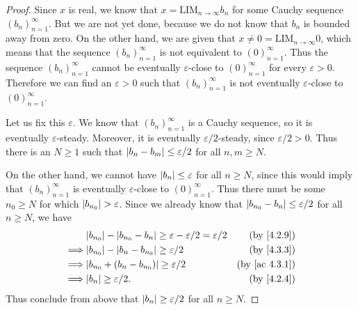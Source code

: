 \begin{proof}
  Since \(x\) is real, we know that \(x = \text{LIM}_{n \to \infty} b_n\) for some Cauchy sequence \((b_n)_{n = 1}^{\infty}\).
  But we are not yet done, because we do not know that \(b_n\) is bounded away from zero.
  On the other hand, we are given that \(x \neq 0 = \text{LIM}_{n \to \infty} 0\), which means that the sequence \((b_n)_{n = 1}^{\infty}\) is not equivalent to \((0)_{n = 1}^{\infty}\).
  Thus the sequence \((b_n)_{n = 1}^{\infty}\) cannot be eventually \(\varepsilon\)-close to \((0)_{n = 1}^{\infty}\) for every \(\varepsilon > 0\).
  Therefore we can find an \(\varepsilon > 0\) such that \((b_n)_{n = 1}^{\infty}\) is not eventually \(\varepsilon\)-close to \((0)_{n = 1}^{\infty}\).

  Let us fix this \(\varepsilon\).
  We know that \((b_n)_{n = 1}^{\infty}\) is a Cauchy sequence, so it is eventually \(\varepsilon\)-steady.
  Moreover, it is eventually \(\varepsilon / 2\)-steady, since \(\varepsilon / 2 > 0\).
  Thus there is an \(N \geq 1\) such that \(\left\lvert b_n - b_m\right\rvert \leq \varepsilon / 2\) for all \(n, m \geq N\).

  On the other hand, we cannot have \(\left\lvert b_n\right\rvert \leq \varepsilon\) for all \(n \geq N\), since this would imply that \((b_n)_{n = 1}^{\infty}\) is eventually \(\varepsilon\)-close to \((0)_{n = 1}^{\infty}\).
  Thus there must be some \(n_0 \geq N\) for which \(\left\lvert b_{n_0}\right\rvert > \varepsilon\).
  Since we already know that \(\left\lvert b_{n_0} - b_n\right\rvert \leq \varepsilon / 2\) for all \(n \geq N\), we have
  \begin{align*}
             & \abs{b_{n_0}} - \abs{b_{n_0} - b_n} \geq \varepsilon - \varepsilon / 2 = \varepsilon / 2 & \text{(by \cref{4.2.9})}    \\
    \implies & \abs{b_{n_0}} - \abs{b_n - b_{n_0}} \geq \varepsilon / 2                                 & \text{(by \cref{4.3.3})}    \\
    \implies & \abs{b_{n_0} + (b_n - b_{n_0})} \geq \varepsilon / 2                                     & \text{(by \cref{ac 4.3.1})} \\
    \implies & \abs{b_n} \geq \varepsilon / 2.                                                          & \text{(by \cref{4.2.4})}    \\
  \end{align*}
  Thus conclude from above that \(\left\lvert b_n\right\rvert \geq \varepsilon / 2\) for all \(n \geq N\).


\end{proof}
